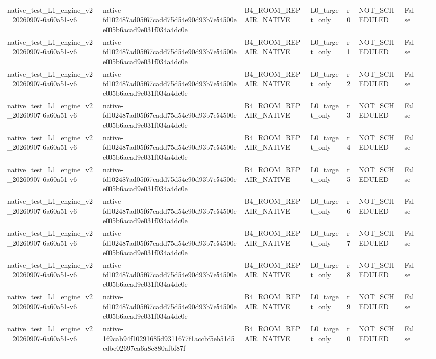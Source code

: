 \begin{tabular}{lllllllll}
native\_test\_L1\_engine\_v2\_20260907-6a60a51-v6 & native-fd102487ad05f67cadd75d54e90d93b7e54500ee005b6acad9e031f034a4dc0e & B4\_ROOM\_REPAIR\_NATIVE & L0\_target\_only & r0 & NOT\_SCHEDULED & False &  &  \\
native\_test\_L1\_engine\_v2\_20260907-6a60a51-v6 & native-fd102487ad05f67cadd75d54e90d93b7e54500ee005b6acad9e031f034a4dc0e & B4\_ROOM\_REPAIR\_NATIVE & L0\_target\_only & r1 & NOT\_SCHEDULED & False &  &  \\
native\_test\_L1\_engine\_v2\_20260907-6a60a51-v6 & native-fd102487ad05f67cadd75d54e90d93b7e54500ee005b6acad9e031f034a4dc0e & B4\_ROOM\_REPAIR\_NATIVE & L0\_target\_only & r2 & NOT\_SCHEDULED & False &  &  \\
native\_test\_L1\_engine\_v2\_20260907-6a60a51-v6 & native-fd102487ad05f67cadd75d54e90d93b7e54500ee005b6acad9e031f034a4dc0e & B4\_ROOM\_REPAIR\_NATIVE & L0\_target\_only & r3 & NOT\_SCHEDULED & False &  &  \\
native\_test\_L1\_engine\_v2\_20260907-6a60a51-v6 & native-fd102487ad05f67cadd75d54e90d93b7e54500ee005b6acad9e031f034a4dc0e & B4\_ROOM\_REPAIR\_NATIVE & L0\_target\_only & r4 & NOT\_SCHEDULED & False &  &  \\
native\_test\_L1\_engine\_v2\_20260907-6a60a51-v6 & native-fd102487ad05f67cadd75d54e90d93b7e54500ee005b6acad9e031f034a4dc0e & B4\_ROOM\_REPAIR\_NATIVE & L0\_target\_only & r5 & NOT\_SCHEDULED & False &  &  \\
native\_test\_L1\_engine\_v2\_20260907-6a60a51-v6 & native-fd102487ad05f67cadd75d54e90d93b7e54500ee005b6acad9e031f034a4dc0e & B4\_ROOM\_REPAIR\_NATIVE & L0\_target\_only & r6 & NOT\_SCHEDULED & False &  &  \\
native\_test\_L1\_engine\_v2\_20260907-6a60a51-v6 & native-fd102487ad05f67cadd75d54e90d93b7e54500ee005b6acad9e031f034a4dc0e & B4\_ROOM\_REPAIR\_NATIVE & L0\_target\_only & r7 & NOT\_SCHEDULED & False &  &  \\
native\_test\_L1\_engine\_v2\_20260907-6a60a51-v6 & native-fd102487ad05f67cadd75d54e90d93b7e54500ee005b6acad9e031f034a4dc0e & B4\_ROOM\_REPAIR\_NATIVE & L0\_target\_only & r8 & NOT\_SCHEDULED & False &  &  \\
native\_test\_L1\_engine\_v2\_20260907-6a60a51-v6 & native-fd102487ad05f67cadd75d54e90d93b7e54500ee005b6acad9e031f034a4dc0e & B4\_ROOM\_REPAIR\_NATIVE & L0\_target\_only & r9 & NOT\_SCHEDULED & False &  &  \\
native\_test\_L1\_engine\_v2\_20260907-6a60a51-v6 & native-169cab94f10291685d9311677f1accbf5eb51d5cdbe02697ea6a8c880afbf87f & B4\_ROOM\_REPAIR\_NATIVE & L0\_target\_only & r0 & NOT\_SCHEDULED & False &  &  \\

\end{tabular}
